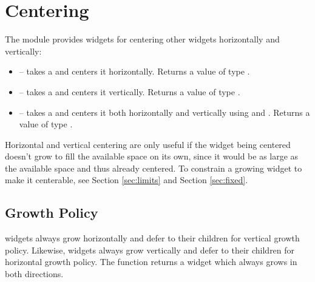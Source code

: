 \section{Centering}
\label{sec:centering}

The  module provides widgets for centering other widgets
horizontally and vertically:

\begin{itemize}
\item {} -- takes a  and centers it
  horizontally.  Returns a value of type .
\item {} -- takes a  and centers it
  vertically.  Returns a value of type .
\item {} -- takes a  and centers it both
  horizontally and vertically using  and .
  Returns a value of type .
\end{itemize}

Horizontal and vertical centering are only useful if the widget being
centered doesn't grow to fill the available space on its own, since it
would be as large as the available space and thus already centered.
To constrain a growing widget to make it centerable, see Section
\ref{sec:limits} and Section \ref{sec:fixed}.

\subsection{Growth Policy}

 widgets always grow horizontally and defer to their
children for vertical growth policy.  Likewise,  widgets
always grow vertically and defer to their children for horizontal
growth policy.  The  function returns a widget which
always grows in both directions.

